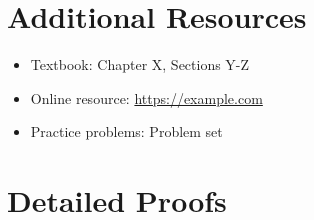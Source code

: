 \documentclass[11pt,a4paper]{article}
\begin{document}
\appendix
\section{Additional Resources}
\begin{itemize}
    \item Textbook: Chapter X, Sections Y-Z
    \item Online resource: \url{https://example.com}
    \item Practice problems: Problem set 
\end{itemize}

\section{Detailed Proofs}
\end{document}
